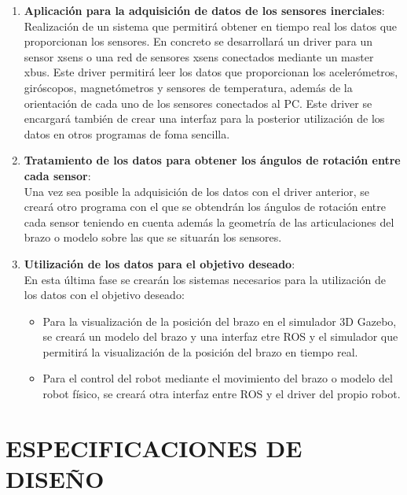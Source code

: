 \documentclass[10pt, a4paper]{report}
\begin{document}
\begin{enumerate}
\item \textbf{Aplicación para la adquisición de datos de los sensores inerciales}: \\
Realización de un sistema que permitirá obtener en tiempo real los datos que proporcionan los sensores. En concreto se desarrollará un driver para un sensor xsens o una red de sensores xsens conectados mediante un master xbus. Este driver permitirá leer los datos que proporcionan los acelerómetros, giróscopos, magnetómetros y sensores de temperatura, además de la orientación de cada uno de los sensores conectados al PC. Este driver se encargará también de crear una interfaz para la posterior utilización de los datos en otros programas de foma sencilla. \\

\item \textbf{Tratamiento de los datos para obtener los ángulos de rotación entre cada sensor}:\\
Una vez sea posible la adquisición de los datos con el driver anterior, se creará otro programa con el que se obtendrán los ángulos de rotación entre cada sensor teniendo en cuenta además la geometría de las articulaciones del brazo o modelo sobre las que se situarán los sensores.\\

\item \textbf{Utilización de los datos para el objetivo deseado}: \\
En esta última fase se crearán los sistemas necesarios para la utilización de los datos con el objetivo deseado:

\begin{itemize}

\item Para la visualización de la posición del brazo en el simulador 3D Gazebo, se creará un modelo del brazo y una interfaz etre ROS y el simulador que permitirá la visualización de la posición del brazo en tiempo real.  

\item Para el control del robot mediante el movimiento del brazo o modelo del robot físico, se creará otra interfaz entre ROS y el driver del propio robot. 

\end{itemize}

\end{enumerate}


\chapter{ESPECIFICACIONES DE DISEÑO}
\end{document}
